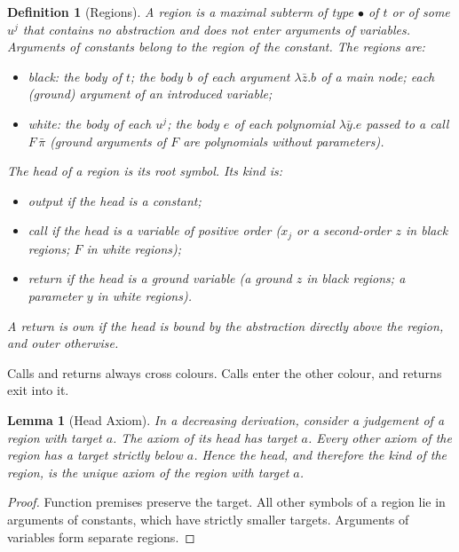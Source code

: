 \documentclass[10pt,a4paper]{article}
\theoremstyle{plain}%
\newtheorem{definition}[theorem]{Definition}
\newtheorem{lemma}[theorem]{Lemma}
\begin{document}
\begin{definition}[Regions]
A \emph{region} is a maximal subterm of type $\bullet$ of $t$ or of some $u^j$ that contains no abstraction and does not enter arguments of variables.
Arguments of constants belong to the region of the constant.
The regions are:
\begin{itemize}
\item \emph{black}: the body of $t$; the body $b$ of each argument $\lambda\bar z.b$ of a main node; each (ground) argument of an introduced variable;
\item \emph{white}: the body of each $u^j$; the body $e$ of each polynomial $\lambda\bar y.e$ passed to a call $F\,\bar\pi$ (ground arguments of $F$ are polynomials without parameters).
\end{itemize}
The \emph{head} of a region is its root symbol.
Its \emph{kind} is:
\begin{itemize}
\item \emph{output} if the head is a constant;
\item \emph{call} if the head is a variable of positive order ($x_j$ or a second-order $z$ in black regions; $F$ in white regions);
\item \emph{return} if the head is a ground variable (a ground $z$ in black regions; a parameter $y$ in white regions).
\end{itemize}
A return is \emph{own} if the head is bound by the abstraction directly above the region, and \emph{outer} otherwise.
\end{definition}

Calls and returns always cross colours.
Calls enter the other colour, and returns exit into it.

\begin{lemma}[Head Axiom]\label{lem:fifth-head}
In a decreasing derivation, consider a judgement of a region with target $a$.
The axiom of its head has target $a$.
Every other axiom of the region has a target strictly below $a$.
Hence the head, and therefore the kind of the region, is the unique axiom of the region with target $a$.
\end{lemma}

\begin{proof}
Function premises preserve the target.
All other symbols of a region lie in arguments of constants, which have strictly smaller targets.
Arguments of variables form separate regions.
\end{proof}
\end{document}
